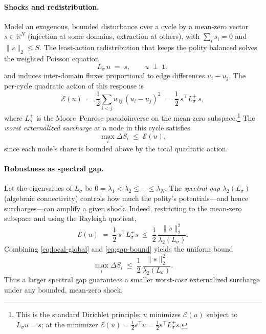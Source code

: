 \documentclass[11pt]{article}
\begin{document}
\paragraph{Shocks and redistribution.}
Model an exogenous, bounded disturbance over a cycle by a mean‑zero vector $s\in\mathbb{R}^N$ (injection at some domains, extraction at others), with $\sum_i s_i=0$ and $\|s\|_2\le S$. The least‑action redistribution that keeps the polity balanced solves the weighted Poisson equation
\begin{equation}
L_\sigma\,u \;=\; s, \qquad u\ \perp\ \mathbf{1},
\label{eq:poisson}
\end{equation}
and induces inter‑domain fluxes proportional to edge differences $u_i-u_j$. The per‑cycle quadratic action of this response is
\begin{equation}
\mathcal{E}(u) \;=\; \frac{1}{2}\sum_{i<j} w_{ij}\,(u_i-u_j)^2 \;=\; \frac{1}{2}\,s^\top L_\sigma^{+}\, s,
\label{eq:energy}
\end{equation}
where $L_\sigma^{+}$ is the Moore–Penrose pseudoinverse on the mean‑zero subspace.\footnote{This is the standard Dirichlet principle: $u$ minimizes $\mathcal{E}(u)$ subject to $L_\sigma u=s$; at the minimizer $\mathcal{E}(u)=\tfrac12 s^\top u=\tfrac12 s^\top L_\sigma^{+} s$.} The \emph{worst externalized surcharge} at a node in this cycle satisfies
\begin{equation}
\max_i \Delta S_i \;\le\; \mathcal{E}(u),
\label{eq:local-global}
\end{equation}
since each node’s share is bounded above by the total quadratic action.

\paragraph{Robustness as spectral gap.}
Let the eigenvalues of $L_\sigma$ be $0=\lambda_1<\lambda_2\le \cdots \le \lambda_N$. The \emph{spectral gap} $\lambda_2(L_\sigma)$ (algebraic connectivity) controls how much the polity’s potentials—and hence surcharges—can amplify a given shock. Indeed, restricting to the mean‑zero subspace and using the Rayleigh quotient,
\begin{equation}
\mathcal{E}(u)
\;=\;
\frac{1}{2}\,s^\top L_\sigma^{+} s
\;\le\;
\frac{1}{2}\,\frac{\|s\|_2^2}{\lambda_2(L_\sigma)}.
\label{eq:gap-bound}
\end{equation}
Combining \eqref{eq:local-global} and \eqref{eq:gap-bound} yields the uniform bound
\begin{equation}
\max_i \Delta S_i \;\le\; \frac{1}{2}\,\frac{\|s\|_2^2}{\lambda_2(L_\sigma)}.
\label{eq:worst-node-bound}
\end{equation}
Thus a larger spectral gap guarantees a smaller worst‑case externalized surcharge under any bounded, mean‑zero shock.
\end{document}
